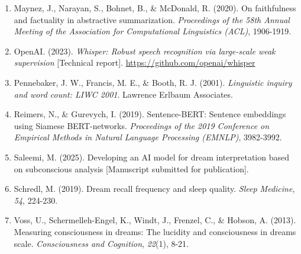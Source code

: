 \documentclass[12pt,a4paper]{report}
\begin{document}
\begin{enumerate}
\item Maynez, J., Narayan, S., Bohnet, B., \& McDonald, R. (2020). On faithfulness and factuality in abstractive summarization. \textit{Proceedings of the 58th Annual Meeting of the Association for Computational Linguistics (ACL)}, 1906-1919.
\item OpenAI. (2023). \textit{Whisper: Robust speech recognition via large-scale weak supervision} [Technical report]. \url{https://github.com/openai/whisper}
\item Pennebaker, J. W., Francis, M. E., \& Booth, R. J. (2001). \textit{Linguistic inquiry and word count: LIWC 2001}. Lawrence Erlbaum Associates.
\item Reimers, N., \& Gurevych, I. (2019). Sentence-BERT: Sentence embeddings using Siamese BERT-networks. \textit{Proceedings of the 2019 Conference on Empirical Methods in Natural Language Processing (EMNLP)}, 3982-3992.
\item Saleemi, M. (2025). Developing an AI model for dream interpretation based on subconscious analysis [Manuscript submitted for publication].
\item Schredl, M. (2019). Dream recall frequency and sleep quality. \textit{Sleep Medicine}, \textit{54}, 224-230.
\item Voss, U., Schermelleh-Engel, K., Windt, J., Frenzel, C., \& Hobson, A. (2013). Measuring consciousness in dreams: The lucidity and consciousness in dreams scale. \textit{Consciousness and Cognition}, \textit{22}(1), 8-21.
\end{enumerate}
\end{document}
